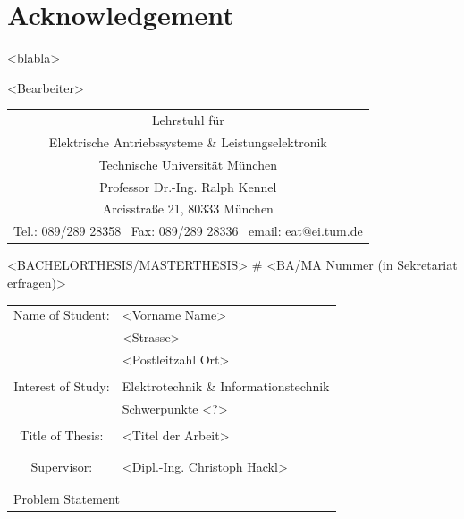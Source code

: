 \newpage

\mbox{}

\thispagestyle{empty}


\chapter*{Acknowledgement}

 <blabla>
\\


\begin{flushright}<Bearbeiter>\par\end{flushright}

\newpage \thispagestyle{empty} 

\vspace*{-1cm}
\begin{center}\begin{tabular}{c}
{\Large Lehrstuhl für}  \tabularnewline
{\Large Elektrische Antriebssysteme \& Leistungselektronik} \tabularnewline
{\large Technische Universität München}\tabularnewline
{\large Professor Dr.-Ing. Ralph Kennel}\tabularnewline
{\small Arcisstraße 21, 80333 München}\tabularnewline
{\scriptsize Tel.: 089/289 28358\hspace{1cm} ~Fax: 089/289 28336
\hspace{1cm} ~email: eat@ei.tum.de}\tabularnewline
\hline
\end{tabular}\par\end{center}

\begin{center}\vspace{0.5cm}\par\end{center}

\begin{center}{\Large <BACHELORTHESIS/MASTERTHESIS> \# <BA/MA Nummer (in
Sekretariat erfragen)>}\par\end{center}{\Large \par}

\begin{center}\vspace{0.5cm} \begin{tabular}{cl}
Name of Student\hfill:&
\multicolumn{1}{l}{<Vorname Name>}\tabularnewline
&
 <Strasse>\tabularnewline
&
<Postleitzahl Ort>\tabularnewline
&
\tabularnewline
Interest of Study\hfill:&
Elektrotechnik \& Informationstechnik \tabularnewline
&
Schwerpunkte <?>\tabularnewline
&
\tabularnewline
Title of Thesis\hfill:&
<Titel der Arbeit>\tabularnewline
&
\tabularnewline
&
\tabularnewline
Supervisor\hfill:&
<Dipl.-Ing. Christoph Hackl>\tabularnewline
&
\tabularnewline
&
\tabularnewline
\multicolumn{2}{l}{Problem Statement}\tabularnewline
\end{tabular}\par\end{center}

